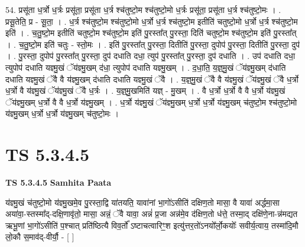 \documentclass[17pt]{extarticle}
\begin{document}
54. प्रसू॑ता ध॒र्त्रो ध॒र्त्रः प्रसू॑ता॒ प्रसू॑ता ध॒र्त्र श्च॑तुष्टो॒म श्च॑तुष्टो॒मो ध॒र्त्रः प्रसू॑ता॒ प्रसू॑ता ध॒र्त्र श्च॑तुष्टो॒मः । . प्रसू॒तेति॒ प्र - सू॒ता॒ । . ध॒र्त्र श्च॑तुष्टो॒म श्च॑तुष्टो॒मो ध॒र्त्रो ध॒र्त्र श्च॑तुष्टो॒म इतीति॑ चतुष्टो॒मो ध॒र्त्रो ध॒र्त्र श्च॑तुष्टो॒म इति॑ । . च॒तु॒ष्टो॒म इतीति॑ चतुष्टो॒म श्च॑तुष्टो॒म इति॑ पु॒रस्ता᳚त् पु॒रस्ता॒ दिति॑ चतुष्टो॒म श्च॑तुष्टो॒म इति॑ पु॒रस्ता᳚त् । . च॒तु॒ष्टो॒म इति॑ चतुः - स्तो॒मः । . इति॑ पु॒रस्ता᳚त् पु॒रस्ता॒ दितीति॑ पु॒रस्ता॒ दुपोप॑ पु॒रस्ता॒ दितीति॑ पु॒रस्ता॒ दुप॑ । . पु॒रस्ता॒ दुपोप॑ पु॒रस्ता᳚त् पु॒रस्ता॒ दुप॑ दधाति दधा॒ त्युप॑ पु॒रस्ता᳚त् पु॒रस्ता॒ दुप॑ दधाति । . उप॑ दधाति दधा॒ त्युपोप॑ दधाति यज्ञ्मु॒खं ॅय॑ज्ञ्मु॒खम् द॑धा॒ त्युपोप॑ दधाति यज्ञ्मु॒खम् । . द॒धा॒ति॒ य॒ज्ञ्॒मु॒खं ॅय॑ज्ञ्मु॒खम् द॑धाति दधाति यज्ञ्मु॒खं ॅवै वै य॑ज्ञ्मु॒खम् द॑धाति दधाति यज्ञ्मु॒खं ॅवै । . य॒ज्ञ्॒मु॒खं ॅवै वै य॑ज्ञ्मु॒खं ॅय॑ज्ञ्मु॒खं ॅवै ध॒र्त्रो ध॒र्त्रो वै य॑ज्ञ्मु॒खं ॅय॑ज्ञ्मु॒खं ॅवै ध॒र्त्रः । . य॒ज्ञ्॒मु॒खमिति॑ यज्ञ् - मु॒खम् । . वै ध॒र्त्रो ध॒र्त्रो वै वै ध॒र्त्रो य॑ज्ञ्मु॒खं ॅय॑ज्ञ्मु॒खम् ध॒र्त्रो वै वै ध॒र्त्रो य॑ज्ञ्मु॒खम् । . ध॒र्त्रो य॑ज्ञ्मु॒खं ॅय॑ज्ञ्मु॒खम् ध॒र्त्रो ध॒र्त्रो य॑ज्ञ्मु॒खम् च॑तुष्टो॒म श्च॑तुष्टो॒मो य॑ज्ञ्मु॒खम् ध॒र्त्रो ध॒र्त्रो य॑ज्ञ्मु॒खम् च॑तुष्टो॒मः । \newline
\pagebreak
{}

\section{ TS 5.3.4.5 }

\textbf{TS 5.3.4.5 } \newline
\textbf{Samhita Paata} \newline

य॑ज्ञ्मु॒खं च॑तुष्टो॒मो य॑ज्ञ्मु॒खमे॒व पु॒रस्ता॒द्वि या॑तयति॒ यावा॑नां भा॒गो॑ऽसीति॑ दक्षिण॒तो मासा॒ वै यावा॑ अर्द्धमा॒सा अया॑वा॒-स्तस्मा᳚द्-दक्षि॒णावृ॑तो॒ मासा॒ अन्नं॒ ॅवै यावा॒ अन्नं॑ प्र॒जा अन्न॑मे॒व द॑क्षिण॒तो ध॑त्ते॒ तस्मा॒द् दक्षि॑णे॒ना-न्न॑मद्यत ऋभू॒णां भा॒गो॑ऽसीति॑ प॒श्चात् प्रति॑ष्ठित्यै विव॒र्तो᳚ ऽष्टाचत्वारिꣳ॒॒श इत्यु॑त्तर॒तो॑ऽनयो᳚र्लो॒कयोः᳚ सवीर्य॒त्वाय॒ तस्मा॑दि॒मौ लो॒कौ स॒माव॑द्-वीर्यौ॒ - [  ] \newline
\end{document}
